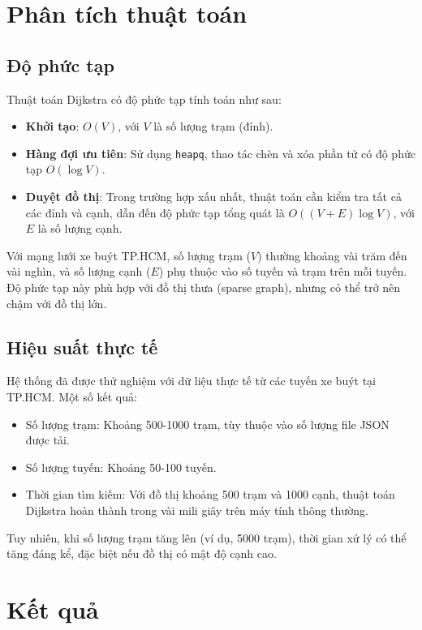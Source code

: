 \documentclass[a4paper,12pt]{article}
\begin{document}
\section{Phân tích thuật toán}
\subsection{Độ phức tạp}
Thuật toán Dijkstra có độ phức tạp tính toán như sau:
\begin{itemize}
    \item \textbf{Khởi tạo}: $O(V)$, với $V$ là số lượng trạm (đỉnh).
    \item \textbf{Hàng đợi ưu tiên}: Sử dụng \texttt{heapq}, thao tác chèn và xóa phần tử có độ phức tạp $O(\log V)$.
    \item \textbf{Duyệt đồ thị}: Trong trường hợp xấu nhất, thuật toán cần kiểm tra tất cả các đỉnh và cạnh, dẫn đến độ phức tạp tổng quát là $O((V + E) \log V)$, với $E$ là số lượng cạnh.
\end{itemize}
Với mạng lưới xe buýt TP.HCM, số lượng trạm ($V$) thường khoảng vài trăm đến vài nghìn, và số lượng cạnh ($E$) phụ thuộc vào số tuyến và trạm trên mỗi tuyến. Độ phức tạp này phù hợp với đồ thị thưa (sparse graph), nhưng có thể trở nên chậm với đồ thị lớn.

\subsection{Hiệu suất thực tế}
Hệ thống đã được thử nghiệm với dữ liệu thực tế từ các tuyến xe buýt tại TP.HCM. Một số kết quả:
\begin{itemize}
    \item Số lượng trạm: Khoảng 500-1000 trạm, tùy thuộc vào số lượng file JSON được tải.
    \item Số lượng tuyến: Khoảng 50-100 tuyến.
    \item Thời gian tìm kiếm: Với đồ thị khoảng 500 trạm và 1000 cạnh, thuật toán Dijkstra hoàn thành trong vài mili giây trên máy tính thông thường.
\end{itemize}
Tuy nhiên, khi số lượng trạm tăng lên (ví dụ, 5000 trạm), thời gian xử lý có thể tăng đáng kể, đặc biệt nếu đồ thị có mật độ cạnh cao.

\section{Kết quả}
\end{document}
